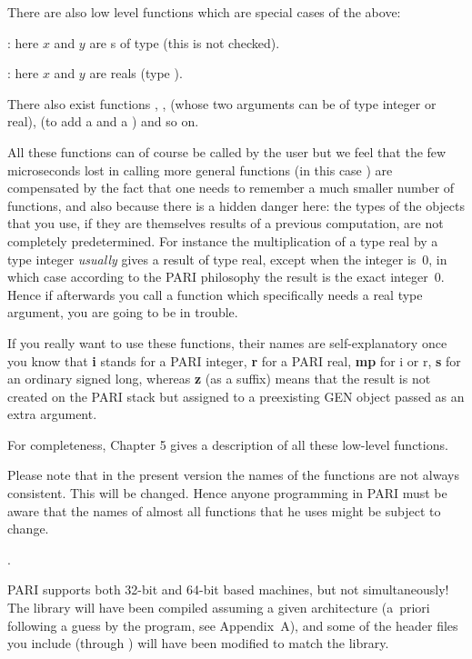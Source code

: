 
\noindent There are also low level functions which are special cases of the
above:

: here $x$ and $y$ are s of type
 (this is not checked).

: here $x$ and $y$ are  reals
(type ).

\noindent
There also exist functions , ,  (whose
two arguments can be of type integer or real),  (to add a 
and a ) and so on.

All these functions can of course be called by the user but we feel that
the few microseconds lost in calling more general functions (in this case
) are compensated by the fact that one needs to remember a much
smaller number of functions, and also because there is a hidden danger here:
the types of the objects that you use, if they are themselves results of a
previous computation, are not completely predetermined. For instance the
multiplication of a type real  by a type integer 
\emph{usually} gives a result of type real, except when the integer is~0, in
which case according to the PARI philosophy the result is the exact integer~0.
Hence if afterwards you call a function which specifically needs a real
type argument, you are going to be in trouble.

If you really want to use these functions, their names are self-explanatory
once you know that {\bf i} stands for a PARI integer, {\bf r} for a PARI
real, {\bf mp} for i or r, {\bf s} for an ordinary signed long, whereas {\bf
z} (as a suffix) means that the result is not created on the PARI
stack but assigned to a preexisting GEN object passed as an extra argument.

For completeness, Chapter 5 gives a description of all these
low-level functions.

Please note that in the present version \vers{} the names of the functions
are not always consistent. This will be changed. Hence anyone programming in
PARI must be aware that the names of almost all functions that he uses might
be subject to change.

.

\noindent
PARI supports both 32-bit and 64-bit based machines, but not simultaneously!
The library will have been compiled assuming a given architecture (a~priori
following a guess by the  program, see Appendix~A), and some
of the header files you include (through ) will have been modified
to match the library.

